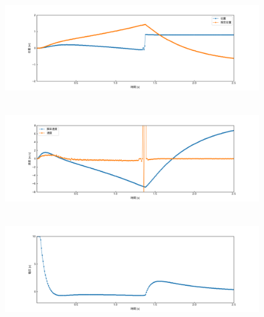 \documentclass[12pt]{jsarticle}
\begin{document}
\begin{figure}[H]
  \begin{center}
    \includegraphics[clip,width=13.0cm, height=4.4cm]{../img/Exp7-1.png}
    \caption{}
    \label{Exp7-1}
  \end{center}
\end{figure}
\begin{figure}[H]
  \begin{center}
    \includegraphics[clip,width=13.0cm, height=4.4cm]{../img/Exp7-2.png}
    \caption{}
    \label{Exp7-2}
  \end{center}
\end{figure}
\begin{figure}[H]
  \begin{center}
    \includegraphics[clip,width=13.0cm, height=4.4cm]{../img/Exp7-3.png}
    \caption{}
    \label{Exp7-3}
  \end{center}
\end{figure}
\end{document}
